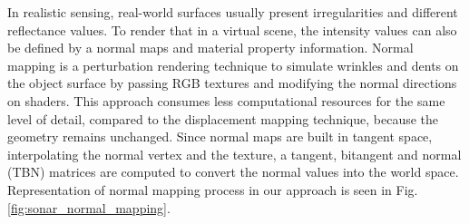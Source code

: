 \documentclass[final,5p,times]{elsarticle}
\begin{document}
In realistic sensing, real-world surfaces usually present irregularities
and different reflectance values. To render that in a virtual scene, the
intensity values can also be defined by a normal maps and material
property information. Normal mapping is a perturbation rendering technique
to simulate wrinkles and dents on the object surface by passing RGB textures and modifying
the normal directions on shaders. This approach consumes less computational
resources for the same level of detail, compared to the displacement mapping
technique, because the geometry remains unchanged. Since normal maps are
built in tangent space, interpolating the normal vertex and the texture,
a tangent, bitangent and normal (TBN) matrices are computed to convert the
normal values into the world space. Representation of normal mapping process
in our approach is seen in Fig. \ref{fig:sonar_normal_mapping}.
\end{document}
